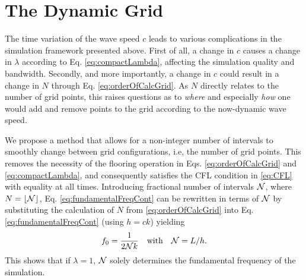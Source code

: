\section{The Dynamic Grid}\label{sec:dynamicGrid}
The time variation of the wave speed $c$ leads to various complications in the simulation framework presented above. First of all, a change in $c$ causes a change in $\lambda$ according to Eq. \eqref{eq:compactLambda}, affecting the simulation quality and bandwidth. Secondly, and more importantly, a change in $c$ could result in a change in $N$ through Eq. \eqref{eq:orderOfCalcGrid}. As $N$ directly relates to the number of grid points, this raises questions as to \textit{where} and especially \textit{how} one would add and remove points to the grid according to the now-dynamic wave speed.

We propose a method that allows for a non-integer number of intervals to smoothly change between grid configurations, i.e, the number of grid points. This removes the necessity of the flooring operation in Eqs. \eqref{eq:orderOfCalcGrid} and \eqref{eq:compactLambda}, and consequently satisfies the CFL condition in \eqref{eq:CFL} with equality at all times. Introducing fractional number of intervals $\mathcal{N}$, where $N = \lfloor \mathcal{N}\rfloor$, Eq. \eqref{eq:fundamentalFreqCont} can be rewritten in terms of $\mathcal{N}$ by substituting the calculation of $N$ from \eqref{eq:orderOfCalcGrid} into Eq. \eqref{eq:fundamentalFreqCont} (using $h=ck$) yielding
\begin{equation}\label{eq:fundamentalFreq}
    f_0 = \frac{1}{2\mathcal{N} k}\quad \text{with}\quad \mathcal{N} = L/h.
\end{equation}
This shows that if $\lambda = 1$, $\mathcal{N}$ solely determines the fundamental frequency of the simulation. 


